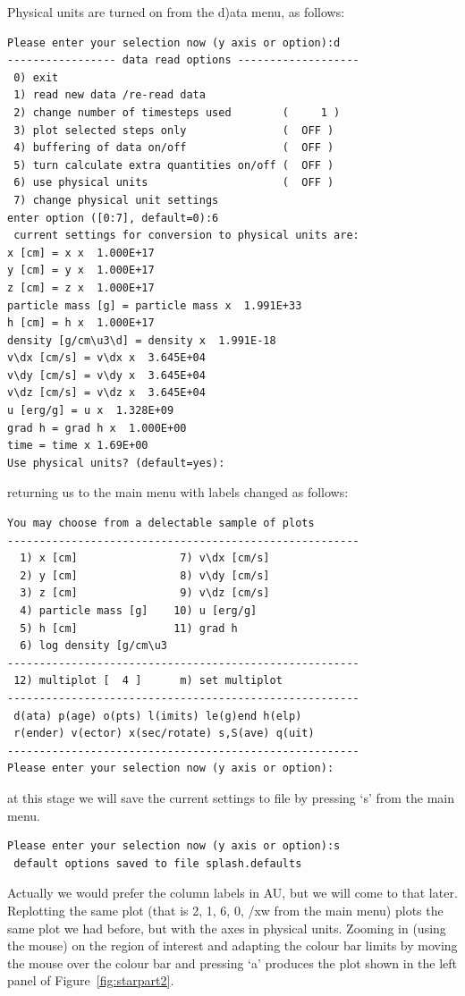 \documentclass[a4paper,10pt]{article}
\begin{document}
 Physical units are turned on from the d)ata menu, as follows:
\begin{verbatim}
Please enter your selection now (y axis or option):d
----------------- data read options -------------------
 0) exit 
 1) read new data /re-read data
 2) change number of timesteps used        (     1 )
 3) plot selected steps only               (  OFF )
 4) buffering of data on/off               (  OFF )
 5) turn calculate extra quantities on/off (  OFF )
 6) use physical units                     (  OFF )
 7) change physical unit settings 
enter option ([0:7], default=0):6
 current settings for conversion to physical units are:
x [cm] = x x  1.000E+17
y [cm] = y x  1.000E+17
z [cm] = z x  1.000E+17
particle mass [g] = particle mass x  1.991E+33
h [cm] = h x  1.000E+17
density [g/cm\u3\d] = density x  1.991E-18
v\dx [cm/s] = v\dx x  3.645E+04
v\dy [cm/s] = v\dy x  3.645E+04
v\dz [cm/s] = v\dz x  3.645E+04
u [erg/g] = u x  1.328E+09
grad h = grad h x  1.000E+00
time = time x 1.69E+00
Use physical units? (default=yes):
\end{verbatim}
returning us to the main menu with labels changed as follows:
\begin{verbatim}
You may choose from a delectable sample of plots 
-------------------------------------------------------
  1) x [cm]                7) v\dx [cm/s]         
  2) y [cm]                8) v\dy [cm/s]         
  3) z [cm]                9) v\dz [cm/s]         
  4) particle mass [g]    10) u [erg/g]           
  5) h [cm]               11) grad h              
  6) log density [g/cm\u3
-------------------------------------------------------
 12) multiplot [  4 ]      m) set multiplot 
-------------------------------------------------------
 d(ata) p(age) o(pts) l(imits) le(g)end h(elp)
 r(ender) v(ector) x(sec/rotate) s,S(ave) q(uit)
-------------------------------------------------------
Please enter your selection now (y axis or option):
\end{verbatim}
at this stage we will save the current settings to file by pressing `s' from the main menu.
\begin{verbatim}
Please enter your selection now (y axis or option):s
 default options saved to file splash.defaults
\end{verbatim}
Actually we would prefer the column labels in AU, but we will come to that later. Replotting the same plot (that is 2, 1, 6, 0, /xw from the main menu) plots the same plot we had before, but with the axes in physical units. Zooming in (using the mouse) on the region of interest and adapting the colour bar limits by moving the mouse over the colour bar and pressing `a' produces the plot shown in the left panel of Figure~\ref{fig:starpart2}. 
\end{document}
